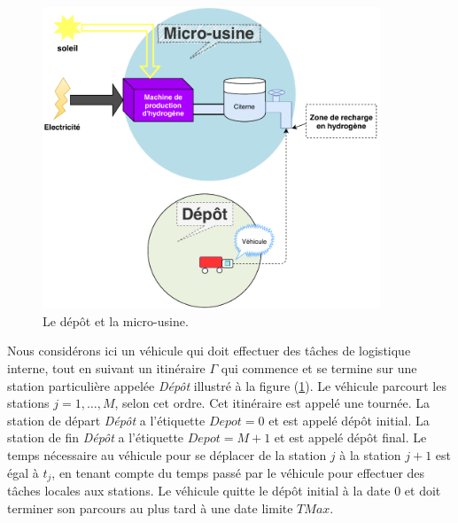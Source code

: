 \begin{figure}[H]
	\centerline{
		\includegraphics[height=9cm]{images_these/illustration_depotrond.pdf}}
	\caption[Le dépôt et la micro-usine]{ Le dépôt et la micro-usine.}
	\label{depot}
\end{figure}
Nous considérons ici un véhicule qui doit effectuer des tâches de logistique interne, tout en suivant un itinéraire $\Gamma$ qui commence et se termine sur une station particulière appelée \textit{Dépôt} illustré à la figure (\ref{depot}). Le véhicule parcourt les stations $j=1, \dots, M$, selon cet ordre. Cet itinéraire est appelé une tournée. La station de départ \textit{Dépôt} a l'étiquette $Depot=0$ et est appelé dépôt initial. La station de fin \textit{Dépôt} a l'étiquette $Depot=M + 1$ et est appelé dépôt final. Le temps nécessaire au véhicule pour se déplacer de la station $j$ à la station $j+1$ est égal à $t_j$, en tenant compte du temps passé par le véhicule pour effectuer des tâches locales aux stations. Le véhicule quitte le dépôt initial à la date $0$ et doit terminer son parcours au plus tard à une date limite $TMax$.


